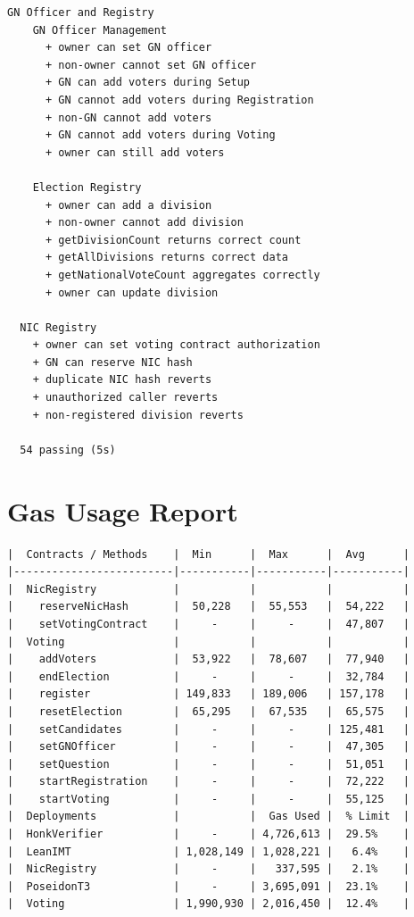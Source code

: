 \begin{lstlisting}[caption={Complete Hardhat test suite output (54 tests passing)}]
  GN Officer and Registry
    GN Officer Management
      + owner can set GN officer
      + non-owner cannot set GN officer
      + GN can add voters during Setup
      + GN cannot add voters during Registration
      + non-GN cannot add voters
      + GN cannot add voters during Voting
      + owner can still add voters

    Election Registry
      + owner can add a division
      + non-owner cannot add division
      + getDivisionCount returns correct count
      + getAllDivisions returns correct data
      + getNationalVoteCount aggregates correctly
      + owner can update division

  NIC Registry
    + owner can set voting contract authorization
    + GN can reserve NIC hash
    + duplicate NIC hash reverts
    + unauthorized caller reverts
    + non-registered division reverts

  54 passing (5s)
\end{lstlisting}

\section{Gas Usage Report}

\begin{lstlisting}[caption={Gas usage per operation (Hardhat gas reporter)}]
|  Contracts / Methods    |  Min      |  Max      |  Avg      |
|-------------------------|-----------|-----------|-----------|
|  NicRegistry            |           |           |           |
|    reserveNicHash       |  50,228   |  55,553   |  54,222   |
|    setVotingContract    |     -     |     -     |  47,807   |
|  Voting                 |           |           |           |
|    addVoters            |  53,922   |  78,607   |  77,940   |
|    endElection          |     -     |     -     |  32,784   |
|    register             | 149,833   | 189,006   | 157,178   |
|    resetElection        |  65,295   |  67,535   |  65,575   |
|    setCandidates        |     -     |     -     | 125,481   |
|    setGNOfficer         |     -     |     -     |  47,305   |
|    setQuestion          |     -     |     -     |  51,051   |
|    startRegistration    |     -     |     -     |  72,222   |
|    startVoting          |     -     |     -     |  55,125   |
|  Deployments            |           |  Gas Used |  % Limit  |
|  HonkVerifier           |     -     | 4,726,613 |  29.5%    |
|  LeanIMT                | 1,028,149 | 1,028,221 |   6.4%    |
|  NicRegistry            |     -     |   337,595 |   2.1%    |
|  PoseidonT3             |     -     | 3,695,091 |  23.1%    |
|  Voting                 | 1,990,930 | 2,016,450 |  12.4%    |
\end{lstlisting}

